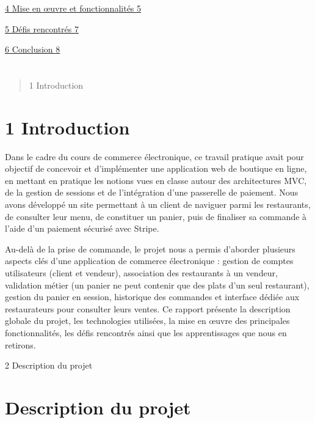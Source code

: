 \documentclass[
]{article}
\begin{document}
\hyperref[mise-en-ux153uvre-et-fonctionnalituxe9s]{4 Mise en œuvre et
fonctionnalités \hyperref[mise-en-ux153uvre-et-fonctionnalituxe9s]{5}}

\hyperref[duxe9fis-rencontruxe9s]{5 Défis rencontrés
\hyperref[duxe9fis-rencontruxe9s]{7}}

\hyperref[conclusion]{6 Conclusion \hyperref[conclusion]{8}}

\section{}\label{section}

\begin{quote}
1 Introduction
\end{quote}

\section{1 Introduction}\label{introduction}

Dans le cadre du cours de commerce électronique, ce travail pratique
avait pour objectif de concevoir et d'implémenter une application web de
boutique en ligne, en mettant en pratique les notions vues en classe
autour des architectures MVC, de la gestion de sessions et de
l'intégration d'une passerelle de paiement. Nous avons développé un site
permettant à un client de naviguer parmi les restaurants, de consulter
leur menu, de constituer un panier, puis de finaliser sa commande à
l'aide d'un paiement sécurisé avec Stripe.

Au-delà de la prise de commande, le projet nous a permis d'aborder
plusieurs aspects clés d'une application de commerce électronique :
gestion de comptes utilisateurs (client et vendeur), association des
restaurants à un vendeur, validation métier (un panier ne peut contenir
que des plats d'un seul restaurant), gestion du panier en session,
historique des commandes et interface dédiée aux restaurateurs pour
consulter leurs ventes. Ce rapport présente la description globale du
projet, les technologies utilisées, la mise en œuvre des principales
fonctionnalités, les défis rencontrés ainsi que les apprentissages que
nous en retirons.

2 Description du projet

\section{Description du projet}\label{description-du-projet}
\end{document}
